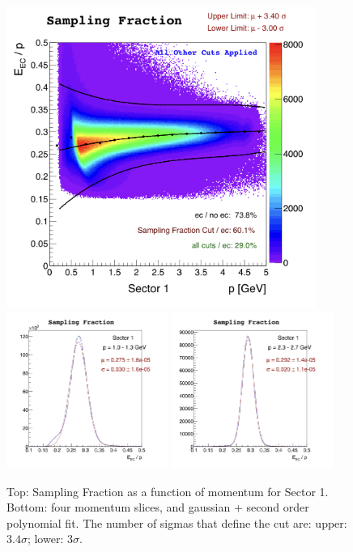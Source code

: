 \begin{figure}[ht]
  \centering
		\includegraphics[width=0.9\textwidth] {img/cut-05sampf_sector-1.png}
		\includegraphics[width=0.47\textwidth]{img/slice-04_cut-05sampf_sector-1.png}
		\includegraphics[width=0.47\textwidth]{img/slice-08_cut-05sampf_sector-1.png}
		\caption{Top: Sampling Fraction as a function of momentum for Sector 1.
					Bottom: four momentum slices, and gaussian + second order 
					polynomial fit. The number of sigmas that define the
               cut are: upper: $3.4\sigma$; lower: $3\sigma$.}
 		\label{fig:sampling_fraction_s1}
\end{figure}

